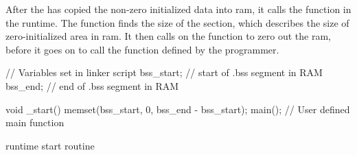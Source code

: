 After the  has copied the non-zero initialized data into \gls{ram}, it calls the  function in the {\C} runtime.
The  function finds the size of the  section, which describes the size of zero-initialized area in \gls{ram}.
It then calls on the  function to zero out the \gls{ram}, before it goes on to call the {\main} function defined by the programmer.

\begin{listing}[H]
\begin{ccode}
// Variables set in linker script
bss_start; // start of .bss segment in RAM
bss_end;   // end of .bss segment in RAM

void _start() {
  memset(bss_start, 0, bss_end - bss_start);
  main(); // User defined main function
}
\end{ccode}
\caption{{\C} runtime start routine}
\label{lst:start}
\end{listing}
